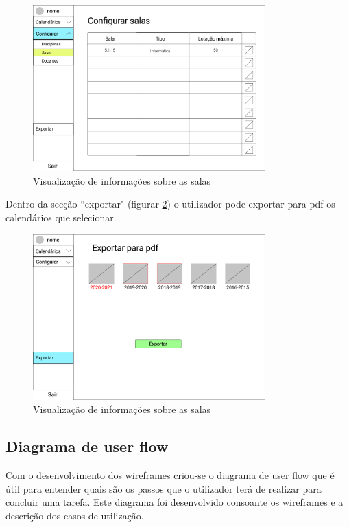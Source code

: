 \documentclass[11pt, twoside]{report}
\begin{document}
	 
	\begin{figure}[H] 
		\centering 
		\includegraphics[width=0.8\textwidth,height=0.8\textheight,keepaspectratio]{image/prototipowireframes/configurarsalas}
		\caption{Visualização de informações sobre as salas}
		\label{configurarsalas}
	\end{figure}

Dentro da secção ``exportar"  (figurar \ref{exportar}) o utilizador pode exportar para pdf os calendários que selecionar.


	\begin{figure}[H] 
	\centering 
	\includegraphics[width=0.8\textwidth,height=0.8\textheight,keepaspectratio]{image/prototipowireframes/exportarpdf}
	\caption{Visualização de informações sobre as salas}
	\label{exportar}
\end{figure}

	
	\subsection{Diagrama de user flow}

	Com o desenvolvimento dos wireframes criou-se o diagrama de user flow que é útil para entender quais são os passos que o utilizador terá de realizar para concluir uma tarefa. Este diagrama foi desenvolvido consoante os wireframes e a descrição dos casos de utilização.
\end{document}
